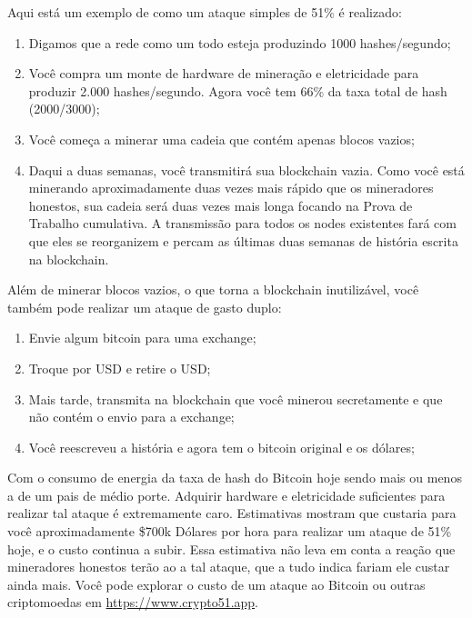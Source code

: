 Aqui está um exemplo de como um ataque simples de 51\% é realizado:

\begin{enumerate}
\item Digamos que a rede como um todo esteja produzindo 1000 hashes/segundo;
\item Você compra um monte de hardware de mineração e eletricidade para produzir 2.000 hashes/segundo. Agora você tem 66\% da taxa total de hash (2000/3000);
\item Você começa a minerar uma cadeia que contém apenas blocos vazios;
\item Daqui a duas semanas, você transmitirá sua blockchain vazia. Como você está minerando aproximadamente duas vezes mais rápido que os mineradores honestos, sua cadeia será duas vezes mais longa focando na Prova de Trabalho cumulativa.
A transmissão para todos os nodes existentes fará com que eles se reorganizem e percam as últimas duas semanas de história escrita na blockchain.
\end{enumerate}

Além de minerar blocos vazios, o que torna a blockchain inutilizável, você também pode realizar um ataque de gasto duplo:

\begin{enumerate}
\item Envie algum bitcoin para uma exchange;
\item Troque por USD e retire o USD;
\item Mais tarde, transmita na blockchain que você minerou secretamente e que não contém o envio para a exchange;
\item Você reescreveu a história e agora tem o bitcoin original e os dólares;
\end{enumerate}

Com o consumo de energia da taxa de hash do Bitcoin hoje sendo mais ou menos a de um pais de médio porte. %
Adquirir hardware e eletricidade suficientes para realizar tal ataque é extremamente caro.
Estimativas mostram que custaria para você aproximadamente \$700k Dólares por hora para realizar um ataque de 51\% hoje, e o custo continua a subir. 
Essa estimativa não leva em conta a reação que mineradores honestos terão ao a tal ataque, que a tudo indica fariam ele custar ainda mais. Você pode explorar o custo de um ataque ao Bitcoin ou outras criptomoedas em \url{https://www.crypto51.app}.

